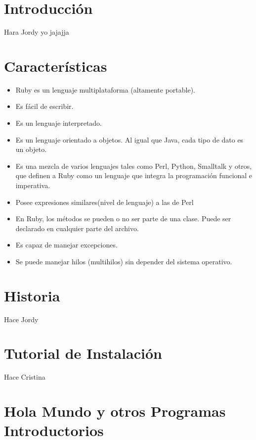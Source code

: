 \documentclass[11pt]{article} %
\begin{document}
\newpage
\section{\fontsize{16}{0} \bf Introducción}
 Hara Jordy
yo jajajja

\section{\fontsize{14}{0} \bf Características}

\begin{itemize}

      \item  Ruby es un lenguaje multiplataforma (altamente portable).
      \item  Es fácil de escribir. 
      \item  Es un lenguaje interpretado.
      \item  Es un lenguaje orientado a objetos. Al igual que Java, cada tipo de dato es un objeto.
      \item  Es una mezcla de varios lenguajes tales como Perl, Python, Smalltalk y otros, que definen a Ruby como un lenguaje que integra la programación funcional e imperativa.
      \item  Posee expresiones similares(nivel de lenguaje) a las de Perl
      \item  En Ruby, los métodos se pueden o no ser parte de una clase. Puede ser declarado en cualquier parte del archivo.
      \item  Es capaz de manejar excepciones.
      \item  Se puede manejar hilos (multihilos) sin depender del sistema operativo.

\end{itemize}

\section{\fontsize{16}{0} \bf Historia}
Hace Jordy

\section{\fontsize{16}{0} \bf Tutorial de Instalación}


Hace Cristina

\section{\fontsize{16}{0} \bf Hola Mundo y otros Programas Introductorios}
\end{document}
